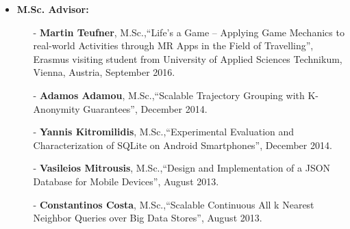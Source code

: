 \documentclass[10pt]{article}
\begin{document}
\begin{itemize}
    \item {\bf M.Sc. Advisor:}
	\begin{itemize}
		\setlength{\itemsep}{0.10ex}
            \item[-] {\bf Martin Teufner}, M.Sc.,``Life’s a Game – Applying Game Mechanics to real-world Activities through MR Apps in the Field of Travelling'', Erasmus visiting student from University of Applied Sciences Technikum, Vienna, Austria, September 2016.
            \item[-]  {\bf Adamos Adamou}, M.Sc.,``Scalable Trajectory Grouping with K-Anonymity Guarantees'', December 2014.
            \item[-] {\bf Yannis Kitromilidis}, M.Sc.,``Experimental Evaluation and Characterization of SQLite on Android Smartphones'', December 2014.
			\item[-] {\bf Vasileios Mitrousis}, M.Sc.,``Design and Implementation of a JSON Database for Mobile Devices'', August 2013.
			\item[-] {\bf Constantinos Costa}, M.Sc.,``Scalable Continuous All k Nearest Neighbor Queries over Big Data Stores'', August 2013.
	\end{itemize}    
	

\end{itemize}
\end{document}
